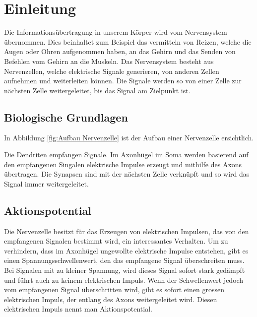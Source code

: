 \section{Einleitung}
%
Die Informationsübertragung in unserem Körper wird vom Nervensystem übernommen.
%
Dies beinhaltet zum Beispiel das vermitteln von Reizen, welche die Augen oder Ohren aufgenommen haben,
an das Gehirn und das Senden von Befehlen vom Gehirn an die Muskeln.
Das Nervensystem besteht aus Nervenzellen, welche elektrische Signale generieren, von anderen Zellen aufnehmen und weiterleiten können.
%
Die Signale werden so von einer Zelle zur nächsten Zelle weitergeleitet, bis das Signal am Zielpunkt ist.
\subsection{Biologische Grundlagen}
In Abbildung \ref{fig:Aufbau Nervenzelle} ist der Aufbau einer Nervenzelle ersichtlich. 


Die Dendriten empfangen Signale. 
%
Im Axonhügel im Soma werden basierend auf den empfangenen Singalen elektrische Impulse erzeugt und mithilfe des Axons übertragen.
%
%
%
Die Synapsen sind mit der nächsten Zelle verknüpft und so wird das Signal immer weitergeleitet.
%

\subsection{Aktionspotential}
Die Nervenzelle besitzt für das Erzeugen von elektrischen Impulsen,
das von den empfangenen Signalen bestimmt wird, ein interessantes Verhalten.
Um zu verhindern, dass im Axonhügel ungewollte elektrische Impulse entstehen, gibt es einen Spannungsschwellenwert,
den das empfangene Signal überschreiten muss.
Bei Signalen mit zu kleiner Spannung, wird dieses Signal sofort stark gedämpft und führt auch zu keinem elektrischen Impuls.
Wenn der Schwellenwert jedoch vom empfangenen Signal überschritten wird, gibt es sofort einen grossen elektrischen Impuls,
%
der entlang des Axons weitergeleitet wird. 
Diesen elektrischen Impuls nennt man Aktionspotential.
%


